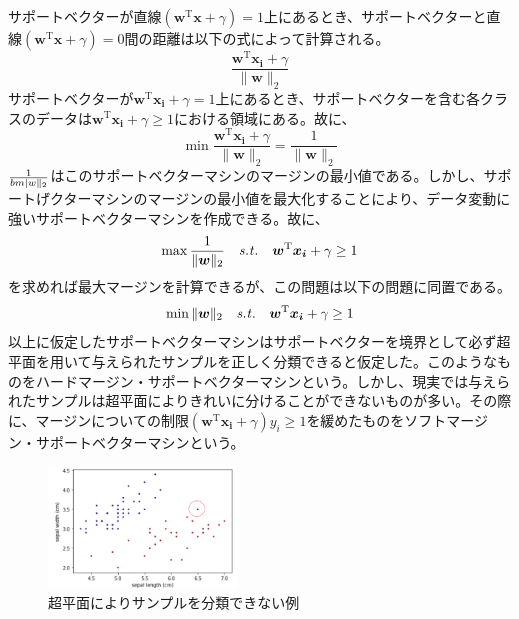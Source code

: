 サポートベクターが直線$(\bm{w}^{\mathrm{T}}\bm{x} + \gamma) = 1$上にあるとき、サポートベクターと直線$(\bm{w}^{\mathrm{T}}\bm{x} + \gamma) = 0$間の距離は以下の式によって計算される。
\begin{equation}
  \frac{\bm{w}^{\mathrm{T}}\bm{x_i} + \gamma}{\|\bm{w}\|_2}
\end{equation}
サポートベクターが$\bm{w}^{\mathrm{T}}\bm{x_i} + \gamma = 1$上にあるとき、サポートベクターを含む各クラスのデータは$\bm{w}^{\mathrm{T}}\bm{x_i} + \gamma \ge 1$における領域にある。故に、
\begin{equation}
  \min\frac{\bm{w}^{\mathrm{T}}\bm{x_i} + \gamma}{\|\bm{w}\|_2} = \frac{1}{\|\bm{w}\|_2}
\end{equation}
$\frac{1}{\\bm{|w}\|_2}$はこのサポートベクターマシンのマージンの最小値である。しかし、サポートげクターマシンのマージンの最小値を最大化することにより、データ変動に強いサポートベクターマシンを作成できる。故に、
\begin{equation}
  \max\frac{1}{\|\bm{w}\|_2}\text{\ \ \ }{\it{s.t.}}\text{\ \ \ }\bm{w}^{\mathrm{T}}\bm{x_i} + \gamma \ge 1
\end{equation}
を求めれば最大マージンを計算できるが、この問題は以下の問題に同置である。
\begin{equation}
  \min\|\bm{w}\|_2\text{\ \ \ }{\it{s.t.}}\text{\ \ \ }\bm{w}^{\mathrm{T}}\bm{x_i} + \gamma \ge 1
\end{equation}
以上に仮定したサポートベクターマシンはサポートベクターを境界として必ず超平面を用いて与えられたサンプルを正しく分類できると仮定した。このようなものをハードマージン・サポートベクターマシンという。しかし、現実では与えられたサンプルは超平面によりきれいに分けることができないものが多い。その際に、マージンについての制限$(\bm{w}^{\mathrm{T}}\bm{x_i} + \gamma)y_i \ge 1$を緩めたものをソフトマージン・サポートベクターマシンという。
\begin{figure}[h]
  \centering
  \includegraphics[width=5cm]{figure/section1/figure3.png}
  \caption{超平面によりサンプルを分類できない例}
\end{figure}
  



  




